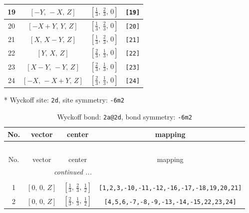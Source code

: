 \documentclass[fleqn,8pt]{jsarticle}
\begin{document}
\begin{longtable}{cccc}
19 & $\left[ - Y,\, - X,\, Z \right]$ & $\left[ \frac{1}{3},\, \frac{2}{3},\, 0 \right]$ & {\tt [19]} \\ \hline
20 & $\left[ - X + Y,\, Y,\, Z \right]$ & $\left[ \frac{1}{3},\, \frac{2}{3},\, 0 \right]$ & {\tt [20]} \\ \hline
21 & $\left[ X,\, X - Y,\, Z \right]$ & $\left[ \frac{1}{3},\, \frac{2}{3},\, 0 \right]$ & {\tt [21]} \\ \hline
22 & $\left[ Y,\, X,\, Z \right]$ & $\left[ \frac{2}{3},\, \frac{1}{3},\, 0 \right]$ & {\tt [22]} \\ \hline
23 & $\left[ X - Y,\, - Y,\, Z \right]$ & $\left[ \frac{2}{3},\, \frac{1}{3},\, 0 \right]$ & {\tt [23]} \\ \hline
24 & $\left[ - X,\, - X + Y,\, Z \right]$ & $\left[ \frac{2}{3},\, \frac{1}{3},\, 0 \right]$ & {\tt [24]} \\
\end{longtable}
* Wyckoff site: {\tt 2d}, site symmetry: {\tt -6m2}
\renewcommand{\arraystretch}{1.2}
\begin{longtable}{cccc}
\caption{Wyckoff bond: {\tt 2a@2d}, bond symmetry: {\tt -6m2}}
 \\
 \hline \hline
No. & vector & center & mapping \\ \hline \endfirsthead

\multicolumn{3}{l}{\tablename\ \thetable{}} \\
 \hline \hline
No. & vector & center & mapping \\ \hline \endhead

 \hline \hline
\multicolumn{3}{r}{\footnotesize\it continued ...} \\ \endfoot

 \hline \hline
\multicolumn{3}{r}{} \\ \endlastfoot

1 & $\left[ 0,\, 0,\, Z \right]$ & $\left[ \frac{1}{3},\, \frac{2}{3},\, \frac{1}{2} \right]$ & {\tt [1,2,3,-10,-11,-12,-16,-17,-18,19,20,21]} \\ \hline
2 & $\left[ 0,\, 0,\, Z \right]$ & $\left[ \frac{2}{3},\, \frac{1}{3},\, \frac{1}{2} \right]$ & {\tt [4,5,6,-7,-8,-9,-13,-14,-15,22,23,24]} \\
\end{longtable}
\renewcommand{\arraystretch}{1.2}
\end{document}
